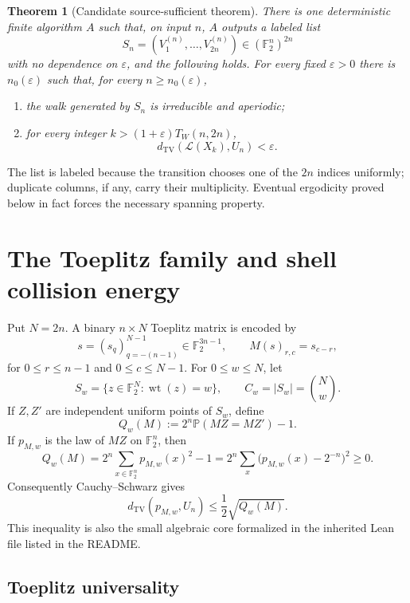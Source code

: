 \documentclass[11pt]{article}
\newtheorem{theorem}{Theorem}
\newcommand{\F}{\mathbb F}
\newcommand{\TV}{d_{\mathrm{TV}}}
\newcommand{\1}{\mathbf 1}
\newcommand{\wt}{\operatorname{wt}}
\newcommand{\Pp}{\mathbb P}
\begin{document}
\begin{theorem}[Candidate source-sufficient theorem]\label{thm:main}
There is one deterministic finite algorithm $A$ such that, on input $n$, $A$ outputs a labeled list
\[
 S_n=(V_1^{(n)},\dots,V_{2n}^{(n)})\in(\F_2^n)^{2n}
\]
with no dependence on $\varepsilon$, and the following holds.  For every fixed $\varepsilon>0$ there is $n_0(\varepsilon)$ such that, for every $n\ge n_0(\varepsilon)$,
\begin{enumerate}[label=(\roman*)]
\item the walk generated by $S_n$ is irreducible and aperiodic;
\item for every integer $k>(1+\varepsilon)T_W(n,2n)$,
\[
 \TV(\mathcal L(X_k),U_n)<\varepsilon.
\]
\end{enumerate}
\end{theorem}

The list is labeled because the transition chooses one of the $2n$ indices uniformly; duplicate columns, if any, carry their multiplicity.  Eventual ergodicity proved below in fact forces the necessary spanning property.

\section{The Toeplitz family and shell collision energy}

Put $N=2n$.  A binary $n\times N$ Toeplitz matrix is encoded by
\[
 s=(s_q)_{q=-(n-1)}^{N-1}\in\F_2^{3n-1},
 \qquad M(s)_{r,c}=s_{c-r},
\]
for $0\le r\le n-1$ and $0\le c\le N-1$.
For $0\le w\le N$, let
\[
 S_w=\{z\in\F_2^N:\wt(z)=w\},\qquad C_w=|S_w|=\binom Nw.
\]
If $Z,Z'$ are independent uniform points of $S_w$, define
\begin{equation}\label{eq:Qdef}
 Q_w(M):=2^n\Pp(MZ=MZ')-1.
\end{equation}
If $p_{M,w}$ is the law of $MZ$ on $\F_2^n$, then
\begin{equation}\label{eq:Qcollision}
 Q_w(M)=2^n\sum_{x\in\F_2^n}p_{M,w}(x)^2-1
       =2^n\sum_x\bigl(p_{M,w}(x)-2^{-n}\bigr)^2\ge0.
\end{equation}
Consequently Cauchy--Schwarz gives
\begin{equation}\label{eq:TVQ}
 \TV(p_{M,w},U_n)\le\frac12\sqrt{Q_w(M)}.
\end{equation}
This inequality is also the small algebraic core formalized in the inherited Lean file listed in the README.

\subsection{Toeplitz universality}
\end{document}
